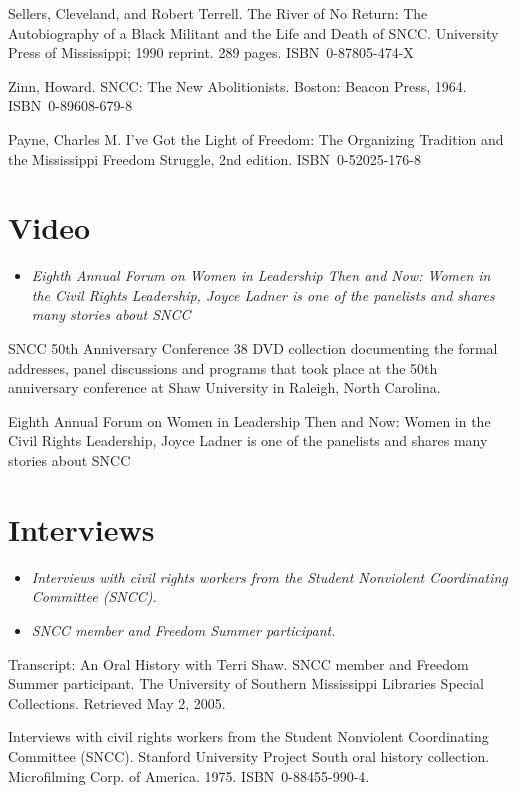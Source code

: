 Sellers, Cleveland, and Robert Terrell. The River of No Return: The
Autobiography of a Black Militant and the Life and Death of SNCC.
University Press of Mississippi; 1990 reprint. 289 pages.
ISBN~0-87805-474-X

Zinn, Howard. SNCC: The New Abolitionists. Boston: Beacon Press, 1964.
ISBN~0-89608-679-8

Payne, Charles M. I've Got the Light of Freedom: The Organizing
Tradition and the Mississippi Freedom Struggle, 2nd edition.
ISBN~0-52025-176-8

\section{Video}\label{video}

\begin{itemize}
\item
  \emph{Eighth Annual Forum on Women in Leadership Then and Now: Women
  in the Civil Rights Leadership, Joyce Ladner is one of the panelists
  and shares many stories about SNCC}
\end{itemize}

SNCC 50th Anniversary Conference 38 DVD collection documenting the
formal addresses, panel discussions and programs that took place at the
50th anniversary conference at Shaw University in Raleigh, North
Carolina.

Eighth Annual Forum on Women in Leadership Then and Now: Women in the
Civil Rights Leadership, Joyce Ladner is one of the panelists and shares
many stories about SNCC

\section{Interviews}\label{interviews}

\begin{itemize}
\item
  \emph{Interviews with civil rights workers from the Student Nonviolent
  Coordinating Committee (SNCC).}
\item
  \emph{SNCC member and Freedom Summer participant.}
\end{itemize}

Transcript: An Oral History with Terri Shaw. SNCC member and Freedom
Summer participant. The University of Southern Mississippi Libraries
Special Collections. Retrieved May 2, 2005.

Interviews with civil rights workers from the Student Nonviolent
Coordinating Committee (SNCC). Stanford University Project South oral
history collection. Microfilming Corp. of America. 1975.
ISBN~0-88455-990-4.

